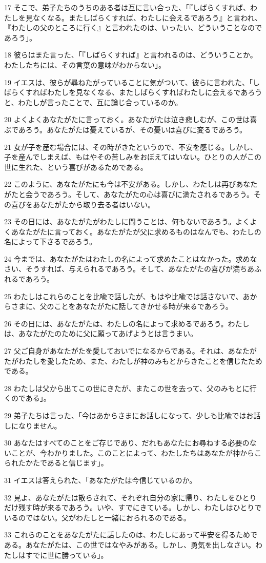 \par 17 そこで、弟子たちのうちのある者は互に言い合った、「『しばらくすれば、わたしを見なくなる。またしばらくすれば、わたしに会えるであろう』と言われ、『わたしの父のところに行く』と言われたのは、いったい、どういうことなのであろう」。
\par 18 彼らはまた言った、「『しばらくすれば』と言われるのは、どういうことか。わたしたちには、その言葉の意味がわからない」。
\par 19 イエスは、彼らが尋ねたがっていることに気がついて、彼らに言われた、「しばらくすればわたしを見なくなる、またしばらくすればわたしに会えるであろうと、わたしが言ったことで、互に論じ合っているのか。
\par 20 よくよくあなたがたに言っておく。あなたがたは泣き悲しむが、この世は喜ぶであろう。あなたがたは憂えているが、その憂いは喜びに変るであろう。
\par 21 女が子を産む場合には、その時がきたというので、不安を感じる。しかし、子を産んでしまえば、もはやその苦しみをおぼえてはいない。ひとりの人がこの世に生れた、という喜びがあるためである。
\par 22 このように、あなたがたにも今は不安がある。しかし、わたしは再びあなたがたと会うであろう。そして、あなたがたの心は喜びに満たされるであろう。その喜びをあなたがたから取り去る者はいない。
\par 23 その日には、あなたがたがわたしに問うことは、何もないであろう。よくよくあなたがたに言っておく。あなたがたが父に求めるものはなんでも、わたしの名によって下さるであろう。
\par 24 今までは、あなたがたはわたしの名によって求めたことはなかった。求めなさい、そうすれば、与えられるであろう。そして、あなたがたの喜びが満ちあふれるであろう。
\par 25 わたしはこれらのことを比喩で話したが、もはや比喩では話さないで、あからさまに、父のことをあなたがたに話してきかせる時が来るであろう。
\par 26 その日には、あなたがたは、わたしの名によって求めるであろう。わたしは、あなたがたのために父に願ってあげようとは言うまい。
\par 27 父ご自身があなたがたを愛しておいでになるからである。それは、あなたがたがわたしを愛したため、また、わたしが神のみもとからきたことを信じたためである。
\par 28 わたしは父から出てこの世にきたが、またこの世を去って、父のみもとに行くのである」。
\par 29 弟子たちは言った、「今はあからさまにお話しになって、少しも比喩ではお話しになりません。
\par 30 あなたはすべてのことをご存じであり、だれもあなたにお尋ねする必要のないことが、今わかりました。このことによって、わたしたちはあなたが神からこられたかたであると信じます」。
\par 31 イエスは答えられた、「あなたがたは今信じているのか。
\par 32 見よ、あなたがたは散らされて、それぞれ自分の家に帰り、わたしをひとりだけ残す時が来るであろう。いや、すでにきている。しかし、わたしはひとりでいるのではない。父がわたしと一緒におられるのである。
\par 33 これらのことをあなたがたに話したのは、わたしにあって平安を得るためである。あなたがたは、この世ではなやみがある。しかし、勇気を出しなさい。わたしはすでに世に勝っている」。

